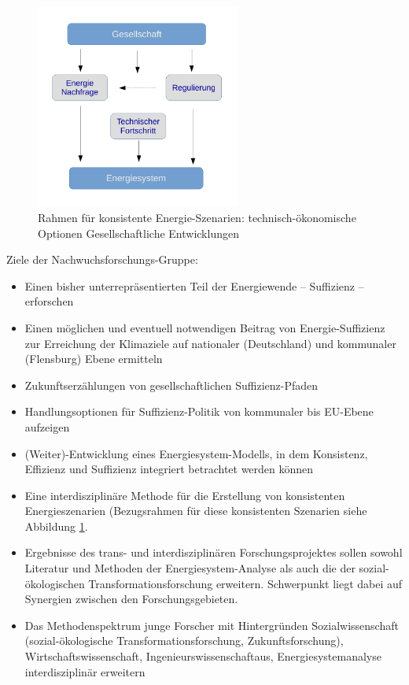 \documentclass[a4paper,11pt,twoside]{scrartcl}
\begin{document}
\begin{figure}[!h]
    \centering
    \includegraphics[width=0.6\textwidth]{figures/Szenarien.pdf}
    \caption{Rahmen für konsistente Energie-Szenarien: technisch-ökonomische Optionen Gesellschaftliche Entwicklungen}
    \label{fig:szenarien}
\end{figure}

Ziele der Nachwuchsforschungs-Gruppe:
\begin{itemize}
 \item Einen bisher unterrepräsentierten Teil der Energiewende -- Suffizienz -- erforschen
 \item Einen möglichen und eventuell notwendigen Beitrag von Energie-Suffizienz zur Erreichung der Klimaziele auf nationaler (Deutschland) und kommunaler (Flensburg) Ebene ermitteln
 \item Zukunftserzählungen von gesellschaftlichen Suffizienz-Pfaden
 \item Handlungsoptionen für Suffizienz-Politik von kommunaler bis EU-Ebene aufzeigen
 \item (Weiter)-Entwicklung eines Energiesystem-Modells, in dem Konsistenz, Effizienz und Suffizienz integriert betrachtet werden können
 \item Eine interdisziplinäre Methode für die Erstellung von konsistenten Energieszenarien (Bezugsrahmen für diese konsistenten Szenarien siehe Abbildung \ref{fig:szenarien}.
 \item Ergebnisse des trans- und interdisziplinären Forschungsprojektes sollen sowohl Literatur und Methoden der Energiesystem-Analyse als auch die der sozial-ökologischen Transformationsforschung erweitern. Schwerpunkt liegt dabei auf Synergien zwischen den Forschungsgebieten.
 \item Das Methodenspektrum junge Forscher mit Hintergründen Sozialwissenschaft (sozial-ökologische Transformationsforschung, Zukunftsforschung), Wirtschaftswissenschaft, Ingenieurswissenschaftaus, Energiesystemanalyse interdisziplinär erweitern
\end{itemize}
\end{document}
